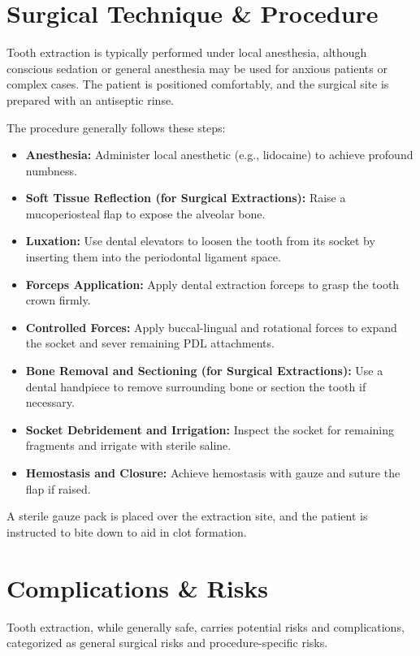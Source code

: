\section*{Surgical Technique \& Procedure}
Tooth extraction is typically performed under local anesthesia, although conscious sedation or general anesthesia may be used for anxious patients or complex cases. The patient is positioned comfortably, and the surgical site is prepared with an antiseptic rinse.

The procedure generally follows these steps:

\begin{itemize}
  \item \textbf{Anesthesia:} Administer local anesthetic (e.g., lidocaine) to achieve profound numbness.
  \item \textbf{Soft Tissue Reflection (for Surgical Extractions):} Raise a mucoperiosteal flap to expose the alveolar bone.
  \item \textbf{Luxation:} Use dental elevators to loosen the tooth from its socket by inserting them into the periodontal ligament space.
  \item \textbf{Forceps Application:} Apply dental extraction forceps to grasp the tooth crown firmly.
  \item \textbf{Controlled Forces:} Apply buccal-lingual and rotational forces to expand the socket and sever remaining PDL attachments.
  \item \textbf{Bone Removal and Sectioning (for Surgical Extractions):} Use a dental handpiece to remove surrounding bone or section the tooth if necessary.
  \item \textbf{Socket Debridement and Irrigation:} Inspect the socket for remaining fragments and irrigate with sterile saline.
  \item \textbf{Hemostasis and Closure:} Achieve hemostasis with gauze and suture the flap if raised.
\end{itemize}

A sterile gauze pack is placed over the extraction site, and the patient is instructed to bite down to aid in clot formation.

\section*{Complications \& Risks}
Tooth extraction, while generally safe, carries potential risks and complications, categorized as general surgical risks and procedure-specific risks.

